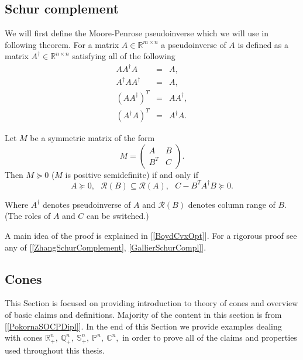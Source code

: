 \documentclass[12pt]{book}
\theoremstyle{definition}
\begin{document}
\begin{appendix}


\chapter{ }
\section{Schur complement}

We will first define the Moore-Penrose pseudoinverse which we will use in following theorem.
\label{Pseudoinverse}
For a matrix $A\in\mathbb{R}^{m\times n}$ a pseudoinverse of $A$ is defined as a matrix $A^\dagger\in \mathbb{R}^{n\times n}$ satisfying all of the following
\begin{eqnarray*}
AA^\dagger A \ &=& A,\\
A^\dagger A A^\dagger &=& A,\\
(AA^\dagger)^T &=& AA^\dagger,\\
(A^\dagger A)^T &=& A^\dagger A.
\end{eqnarray*}

\label{SchurCompl}
Let $M$ be a symmetric matrix of the form
$$M = \left(\begin{array}{cc}
A & B\\
B^T & C
\end{array}\right).$$ 
Then $M\succeq 0$ ($M$ is positive semidefinite) if and only if 
$$A\succeq 0, \ \ \ \mathcal{R}(B)\subseteq \mathcal{R}(A),\ \ \ C - B^TA^\dagger B \succeq 0.$$


Where $A^\dagger$ denotes pseudoinverse of $A$ and $\mathcal{R}(B)$ denotes column range of $B$. (The roles of $A$ and $C$ can be switched.)\rm 

\proof A main idea of the proof is explained in [\ref{BoydCvxOpt}]. For a rigorous proof see any of [\ref{ZhangSchurComplement}, \ref{GallierSchurCompl}].


\section{Cones}
\label{Cones}
This Section is focused on providing introduction to theory of cones and overview of basic claims and definitions.
Majority of the content in this section is from [\ref{PokornaSOCPDipl}]. In the end of this Section we provide examples dealing with cones $\mathbb{R}^n_+,\ \mathbb{Q}^n_+,\ \mathbb{S}^n_+, \ \mathbb{P}^n,\ \mathbb{C}^n,$  in order to prove all of the claims and properties used throughout this thesis.


\end{appendix}
\end{document}
